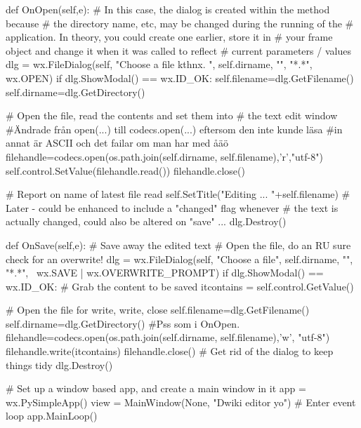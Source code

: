     def OnOpen(self,e):
        # In this case, the dialog is created within the method because
        # the directory name, etc, may be changed during the running of the
        # application. In theory, you could create one earlier, store it in
        # your frame object and change it when it was called to reflect
        # current parameters / values
        dlg = wx.FileDialog(self, "Choose a file kthnx. ", self.dirname, "", "*.*", wx.OPEN)
        if dlg.ShowModal() == wx.ID_OK:
            self.filename=dlg.GetFilename()
            self.dirname=dlg.GetDirectory()

            # Open the file, read the contents and set them into
            # the text edit window
            #Ändrade från open(...) till codecs.open(...) eftersom den inte kunde läsa
            #in annat är ASCII och det failar om man har med åäö
            filehandle=codecs.open(os.path.join(self.dirname, self.filename),'r',"utf-8")
            self.control.SetValue(filehandle.read())
            filehandle.close()

            # Report on name of latest file read
            self.SetTitle("Editing ... "+self.filename)
            # Later - could be enhanced to include a "changed" flag whenever
            # the text is actually changed, could also be altered on "save" ...
        dlg.Destroy()

    def OnSave(self,e):
        # Save away the edited text
        # Open the file, do an RU sure check for an overwrite!
        dlg = wx.FileDialog(self, "Choose a file", self.dirname, "", "*.*", \
                wx.SAVE | wx.OVERWRITE_PROMPT)
        if dlg.ShowModal() == wx.ID_OK:
            # Grab the content to be saved
            itcontains = self.control.GetValue()

              # Open the file for write, write, close
            self.filename=dlg.GetFilename()
            self.dirname=dlg.GetDirectory()
            #Pss som i OnOpen.
            filehandle=codecs.open(os.path.join(self.dirname, self.filename),'w', "utf-8")
            filehandle.write(itcontains)
            filehandle.close()
        # Get rid of the dialog to keep things tidy
        dlg.Destroy()

# Set up a window based app, and create a main window in it
app = wx.PySimpleApp()
view = MainWindow(None, "Dwiki editor yo")
# Enter event loop
app.MainLoop()



